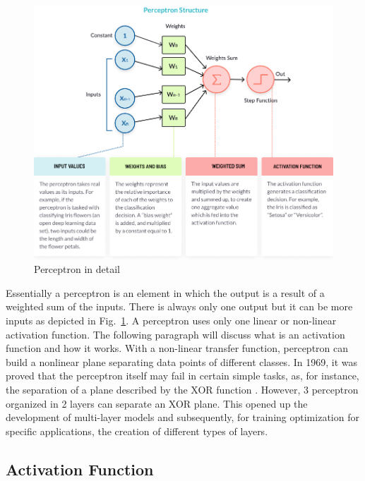 \documentclass[12pt]{report}
\begin{document}
\begin{figure}[t]
    \centering
    \includegraphics[width=\textwidth]{perceptron-structure.png}
    \caption{Perceptron in detail \cite{percepimage}}
    \label{fig:perceptron}
\end{figure}

Essentially a perceptron is an element in which the output is a result of a weighted sum
of the inputs. There is always only one output but it can be more inputs as depicted in Fig.~\ref{fig:perceptron}. 
A perceptron uses only one linear or non-linear activation function. The following paragraph will discuss what is an activation function and how it works.
With a non-linear transfer function, perceptron can build a nonlinear plane separating data points of different classes.
In 1969, it was proved that the perceptron itself may fail in certain simple tasks, as, for instance,
the separation of a plane described by the XOR function  \cite{xorproblem}. 
However, 3 perceptron organized in 2 layers can separate an XOR plane.
This opened up the development of multi-layer models and subsequently, for training optimization for specific
applications, the creation of different types of layers.


\subsection{Activation Function}
\end{document}
